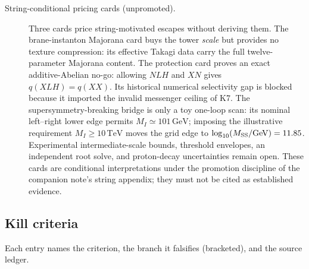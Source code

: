 \documentclass[
  aps,
  prd,
  preprint,
  nofootinbib,
  superscriptaddress,
  longbibliography
]{revtex4-2}
\begin{document}
\begin{description}
\item[String-conditional pricing cards (unpromoted).]
Three cards price string-motivated escapes without deriving them.  The
brane-instanton Majorana card buys the tower \emph{scale} but provides no
texture compression: its effective Takagi data carry the full
twelve-parameter Majorana content.  The protection card proves an exact
additive-Abelian no-go: allowing \(NLH\) and \(XN\) gives
\(q(XLH)=q(XX)\).  Its historical numerical selectivity gap is blocked
because it imported the invalid messenger ceiling of K7.  The
supersymmetry-breaking bridge is only a toy one-loop scan: its nominal
left--right lower edge permits \(M_I\simeq101\,\mathrm{GeV}\); imposing the
illustrative requirement \(M_I\ge10\,\mathrm{TeV}\) moves the grid edge to
\(\log_{10}(M_{\rm SS}/{\rm GeV})=11.85\).  Experimental intermediate-scale
bounds, threshold envelopes, an independent root solve, and proton-decay
uncertainties remain open.  These cards are conditional interpretations
under the promotion discipline of the companion note's string appendix;
they must not be cited as established evidence.
\end{description}

\subsection{Kill criteria}
\label{sec:killbank}

Each entry names the criterion, the branch it falsifies (bracketed),
and the source ledger.
\end{document}
